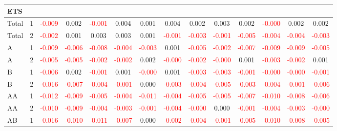 \begin{table}[!htb]
{\begin{tabular}{llcccccccccccc}
\hline
ETS &  &  &  &  &  &  &  &  &  &  &  &  & \\
\hline
Total & 1 & \textcolor{red}{-0.009} & 0.002 & \textcolor{red}{-0.001} & 0.004 & 0.001 & 0.004 & 0.002 & 0.003 & 0.002 & \textcolor{red}{-0.000} & 0.002 & 0.002\\
Total & 2 & \textcolor{red}{-0.002} & 0.001 & 0.003 & 0.003 & 0.001 & \textcolor{red}{-0.001} & \textcolor{red}{-0.003} & \textcolor{red}{-0.001} & \textcolor{red}{-0.005} & \textcolor{red}{-0.004} & \textcolor{red}{-0.004} & \textcolor{red}{-0.003}\\
A & 1 & \textcolor{red}{-0.009} & \textcolor{red}{-0.006} & \textcolor{red}{-0.008} & \textcolor{red}{-0.004} & \textcolor{red}{-0.003} & 0.001 & \textcolor{red}{-0.005} & \textcolor{red}{-0.002} & \textcolor{red}{-0.007} & \textcolor{red}{-0.009} & \textcolor{red}{-0.009} & \textcolor{red}{-0.005}\\
A & 2 & \textcolor{red}{-0.005} & \textcolor{red}{-0.005} & \textcolor{red}{-0.002} & \textcolor{red}{-0.002} & 0.002 & \textcolor{red}{-0.000} & \textcolor{red}{-0.002} & \textcolor{red}{-0.000} & 0.001 & \textcolor{red}{-0.003} & \textcolor{red}{-0.002} & 0.001\\
B & 1 & \textcolor{red}{-0.006} & 0.002 & \textcolor{red}{-0.001} & 0.001 & \textcolor{red}{-0.000} & 0.001 & \textcolor{red}{-0.003} & \textcolor{red}{-0.003} & \textcolor{red}{-0.001} & \textcolor{red}{-0.000} & \textcolor{red}{-0.000} & \textcolor{red}{-0.001}\\
B & 2 & \textcolor{red}{-0.016} & \textcolor{red}{-0.007} & \textcolor{red}{-0.004} & \textcolor{red}{-0.001} & 0.000 & \textcolor{red}{-0.003} & \textcolor{red}{-0.004} & \textcolor{red}{-0.005} & \textcolor{red}{-0.003} & \textcolor{red}{-0.004} & \textcolor{red}{-0.001} & \textcolor{red}{-0.006}\\
AA & 1 & \textcolor{red}{-0.012} & \textcolor{red}{-0.009} & \textcolor{red}{-0.005} & \textcolor{red}{-0.004} & \textcolor{red}{-0.011} & \textcolor{red}{-0.004} & \textcolor{red}{-0.005} & \textcolor{red}{-0.005} & \textcolor{red}{-0.007} & \textcolor{red}{-0.010} & \textcolor{red}{-0.008} & \textcolor{red}{-0.006}\\
AA & 2 & \textcolor{red}{-0.010} & \textcolor{red}{-0.009} & \textcolor{red}{-0.004} & \textcolor{red}{-0.003} & \textcolor{red}{-0.001} & \textcolor{red}{-0.004} & \textcolor{red}{-0.000} & 0.000 & \textcolor{red}{-0.001} & \textcolor{red}{-0.004} & \textcolor{red}{-0.003} & \textcolor{red}{-0.000}\\
AB & 1 & \textcolor{red}{-0.016} & \textcolor{red}{-0.010} & \textcolor{red}{-0.011} & \textcolor{red}{-0.007} & 0.000 & \textcolor{red}{-0.002} & \textcolor{red}{-0.004} & \textcolor{red}{-0.001} & \textcolor{red}{-0.005} & \textcolor{red}{-0.010} & \textcolor{red}{-0.008} & \textcolor{red}{-0.005}\\

\end{tabular}}
\end{table}
